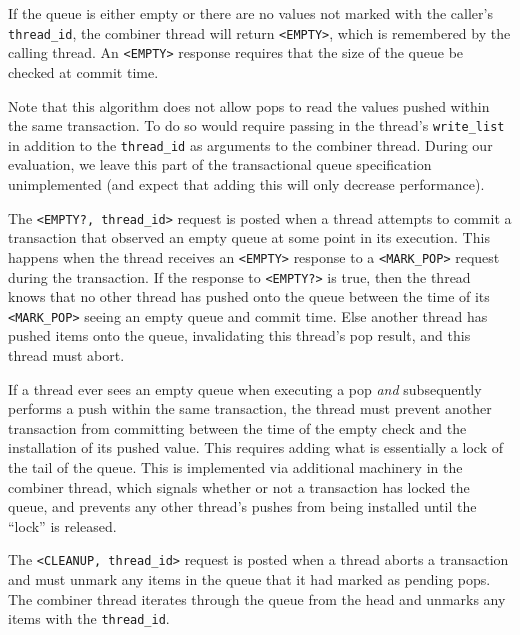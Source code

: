 If the queue is either empty or there are no values not marked with the caller's \texttt{thread\_id}, the combiner thread will return \texttt{<EMPTY>}, which is remembered by the calling thread. An \texttt{<EMPTY>} response requires that the size of the queue be checked at commit time.

Note that this algorithm does not allow pops to read the values pushed within the same transaction. To do so would require passing in the thread's \texttt{write\_list} in addition to the \texttt{thread\_id} as arguments to the combiner thread. During our evaluation, we leave this part of the transactional queue specification unimplemented (and expect that adding this will only decrease performance).

The \texttt{<EMPTY?, thread\_id>} request is posted when a thread attempts to commit a transaction that observed an empty queue at some point in its execution. This happens when the thread receives an \texttt{<EMPTY>} response to a \texttt{<MARK\_POP>} request during the transaction. If the response to \texttt{<EMPTY?>} is true, then the thread knows that no other thread has pushed onto the queue between the time of its \texttt{<MARK\_POP>} seeing an empty queue and commit time. Else another thread has pushed items onto the queue, invalidating this thread's pop result, and this thread must abort.

If a thread ever sees an empty queue when executing a pop \emph{and} subsequently performs a push within the same transaction, the thread must prevent another transaction from committing between the time of the empty check and the installation of its pushed value. This requires adding what is essentially a lock of the tail of the queue. This is implemented via additional machinery in the combiner thread, which signals whether or not a transaction has locked the queue, and prevents any other thread's pushes from being installed until the ``lock'' is released.

The \texttt{<CLEANUP, thread\_id>} request is posted when a thread aborts a transaction and must unmark any items in the queue that it had marked as pending pops. The combiner thread iterates through the queue from the head and unmarks any items with the \texttt{thread\_id}.
